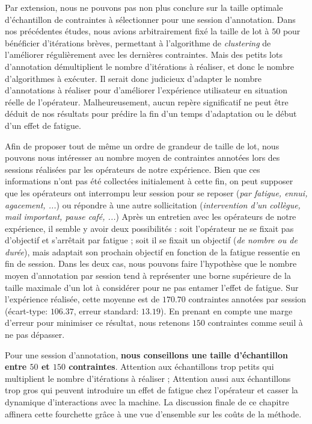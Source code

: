 			Par extension, nous ne pouvons pas non plus conclure sur la taille optimale d'échantillon de contraintes à sélectionner pour une session d'annotation.
			Dans nos précédentes études, nous avions arbitrairement fixé la taille de lot à $50$ pour bénéficier d'itérations brèves, permettant à l'algorithme de \textit{clustering} de l'améliorer régulièrement avec les dernières contraintes.
			Mais des petits lots d'annotation démultiplient le nombre d'itérations à réaliser, et donc le nombre d'algorithmes à exécuter.
			Il serait donc judicieux d'adapter le nombre d'annotations à réaliser pour d'améliorer l'expérience utilisateur en situation réelle de l'opérateur.
			Malheureusement, aucun repère significatif ne peut être déduit de nos résultats pour prédire la fin d'un temps d'adaptation ou le début d'un effet de fatigue.
			
			Afin de proposer tout de même un ordre de grandeur de taille de lot, nous pouvons nous intéresser au nombre moyen de contraintes annotées lors des sessions réalisées par les opérateurs de notre expérience.
			Bien que ces informations n'ont pas été collectées initialement à cette fin, on peut supposer que les opérateurs ont interrompu leur session pour se reposer (\textit{par fatigue, ennui, agacement, ...}) ou répondre à une autre sollicitation (\textit{intervention d'un collègue, mail important, pause café, ...})
			Après un entretien avec les opérateurs de notre expérience, il semble y avoir deux possibilités : soit l'opérateur ne se fixait pas d'objectif et s'arrêtait par fatigue ; soit il se fixait un objectif (\textit{de nombre ou de durée}), mais adaptait son prochain objectif en fonction de la fatigue ressentie en fin de session.
			Dans les deux cas, nous pouvons faire l'hypothèse que le nombre moyen d'annotation par session tend à représenter une borne supérieure de la taille maximale d'un lot à considérer pour ne pas entamer l'effet de fatigue.
			Sur l'expérience réalisée, cette moyenne est de $170.70$ contraintes annotées par session (écart-type: $106.37$, erreur standard: $13.19$).
			En prenant en compte une marge d'erreur pour minimiser ce résultat, nous retenons $150$ contraintes comme seuil à ne pas dépasser.
			
			\begin{leftBarSummary}
				Pour une session d'annotation, \textbf{nous conseillons une taille d'échantillon entre $50$ et $150$ contraintes}.
				Attention aux échantillons trop petits qui multiplient le nombre d'itérations à réaliser ;
				Attention aussi aux échantillons trop gros qui peuvent introduire un effet de fatigue chez l'opérateur et casser la dynamique d'interactions avec la machine.
				La discussion finale de ce chapitre affinera cette fourchette grâce à une vue d'ensemble sur les coûts de la méthode.
			\end{leftBarSummary}
			

